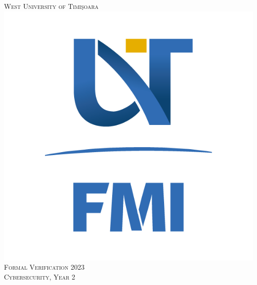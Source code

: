 \documentclass[12pt]{report}
\begin{document}
\begin{titlepage}

\newcommand{\HRule}{\rule{\linewidth}{0.5mm}} %

\center %
 

\textsc{\LARGE West University of Timi\c soara}\\[1.5cm] %
\includegraphics[scale=.2]{FMI-03[1].png}\\[1cm] %
\textsc{\Large Formal Verification 2023}\\[0.5cm] %
\textsc{\large Cybersecurity, Year 2}\\[0.5cm] %



\end{titlepage}
\end{document}

